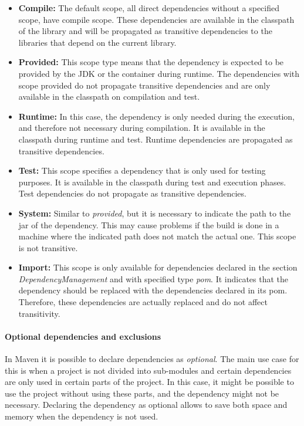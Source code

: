 \begin{itemize}
  \item \textbf{Compile:} The default scope, all direct dependencies without a specified scope, have compile scope. These dependencies are available in the classpath of the library and will be propagated as transitive dependencies to the libraries that depend on the current library.

  \item \textbf{Provided:} This scope type means that the dependency is expected to be provided by the JDK or the container during runtime. The dependencies with scope provided do not propagate transitive dependencies and are only available in the classpath on compilation and test.

  \item \textbf{Runtime:} In this case, the dependency is only needed during the execution, and therefore not necessary during compilation. It is available in the classpath during runtime and test. Runtime dependencies are propagated as transitive dependencies.

  \item \textbf{Test:} This scope specifies a dependency that is only used for testing purposes. It is available in the classpath during test and execution phases. Test dependencies do not propagate as transitive dependencies.

  \item \textbf{System:} Similar to \textit{provided}, but it is necessary to indicate the path to the jar of the dependency. This may cause problems if the build is done in a machine where the indicated path does not match the actual one. This scope is not transitive.

  \item \textbf{Import:} This scope is only available for dependencies declared in the section \textit{DependencyManagement} and with specified type \textit{pom}. It indicates that the dependency should be replaced with the dependencies declared in its pom. Therefore, these dependencies are actually replaced and do not affect transitivity.
\end{itemize}

\paragraph{Optional dependencies and exclusions}
In Maven it is possible to declare dependencies as \textit{optional}. The main use case for this is when a project is not divided into sub-modules and certain dependencies are only used in certain parts of the project. In this case, it might be possible to use the project without using these parts, and the dependency might not be necessary. Declaring the dependency as optional allows to save both space and memory when the dependency is not used.

